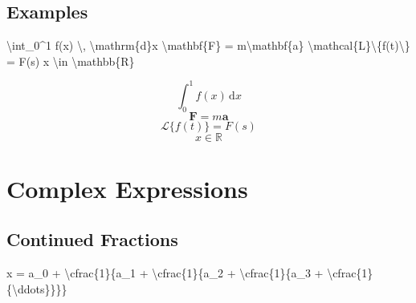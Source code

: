 \documentclass[
  letterpaper,
  DIV=11,
  numbers=noendperiod]{scrartcl}
\newenvironment{Shaded}{\begin{snugshade}}{\end{snugshade}}
\newcommand{\SpecialCharTok}[1]{\textcolor[rgb]{0.37,0.37,0.37}{#1}}
\newcommand{\SpecialStringTok}[1]{\textcolor[rgb]{0.13,0.47,0.30}{#1}}
\begin{document}
\hypertarget{examples-5}{%
\subsection{Examples}\label{examples-5}}

\begin{Shaded}
\begin{Highlighting}[]
\SpecialStringTok{$$}\SpecialCharTok{\textbackslash{}int}\SpecialStringTok{\_0\^{}1 f(x) }\SpecialCharTok{\textbackslash{},}\SpecialStringTok{ }\SpecialCharTok{\textbackslash{}mathrm}\SpecialStringTok{\{d\}x$$}
\SpecialStringTok{$$}\SpecialCharTok{\textbackslash{}mathbf}\SpecialStringTok{\{F\} = m}\SpecialCharTok{\textbackslash{}mathbf}\SpecialStringTok{\{a\}$$}
\SpecialStringTok{$$}\SpecialCharTok{\textbackslash{}mathcal}\SpecialStringTok{\{L\}}\SpecialCharTok{\textbackslash{}\{}\SpecialStringTok{f(t)}\SpecialCharTok{\textbackslash{}\}}\SpecialStringTok{ = F(s)$$}
\SpecialStringTok{$$x }\SpecialCharTok{\textbackslash{}in}\SpecialStringTok{ }\SpecialCharTok{\textbackslash{}mathbb}\SpecialStringTok{\{R\}$$}
\end{Highlighting}
\end{Shaded}

\[\int_0^1 f(x) \, \mathrm{d}x\] \[\mathbf{F} = m\mathbf{a}\]
\[\mathcal{L}\{f(t)\} = F(s)\] \[x \in \mathbb{R}\]

\hypertarget{complex-expressions}{%
\section{Complex Expressions}\label{complex-expressions}}

\hypertarget{continued-fractions}{%
\subsection{Continued Fractions}\label{continued-fractions}}

\begin{Shaded}
\begin{Highlighting}[]
\SpecialStringTok{$$x = a\_0 + }\SpecialCharTok{\textbackslash{}cfrac}\SpecialStringTok{\{1\}\{a\_1 + }\SpecialCharTok{\textbackslash{}cfrac}\SpecialStringTok{\{1\}\{a\_2 + }\SpecialCharTok{\textbackslash{}cfrac}\SpecialStringTok{\{1\}\{a\_3 + }\SpecialCharTok{\textbackslash{}cfrac}\SpecialStringTok{\{1\}\{}\SpecialCharTok{\textbackslash{}ddots}\SpecialStringTok{\}\}\}\}$$}
\end{Highlighting}
\end{Shaded}
\end{document}

